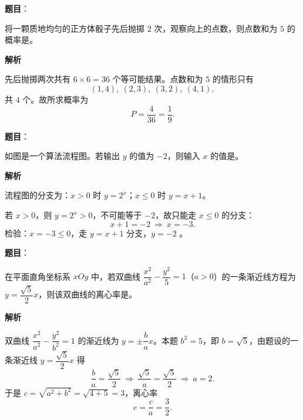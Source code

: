 \begin{answer}

\textbf{题目}：

将一颗质地均匀的正方体骰子先后抛掷 $2$ 次，观察向上的点数，则点数和为 $5$ 的概率是\gkblank{}。

\textbf{解析}

先后抛掷两次共有 $6\times6=36$ 个等可能结果。点数和为 $5$ 的情形只有
\nopagebreak[4]
\[(1,4),\ (2,3),\ (3,2),\ (4,1),\]
共 $4$ 个。故所求概率为
\nopagebreak[4]
\[P=\frac4{36}=\frac19 .\]


\end{answer}
\begin{answer}

\textbf{题目}：

如图是一个算法流程图。若输出 $y$ 的值为 $-2$，则输入 $x$ 的值是\gkblank{}。
\nopagebreak[4]
\begin{center}\end{center}
\nopagebreak[4]
\textbf{解析}

流程图的分支为：$x>0$ 时 $y=2^x$；$x\leqslant0$ 时 $y=x+1$。

若 $x>0$，则 $y=2^x>0$，不可能等于 $-2$，故只能走 $x\leqslant0$ 的分支：
\nopagebreak[4]
\[x+1=-2\ \Longrightarrow\ x=-3 .\]
检验：$x=-3\leqslant0$，走 $y=x+1$ 分支，$y=-2$ 。


\end{answer}
\begin{answer}

\textbf{题目}：

在平面直角坐标系 $xOy$ 中，若双曲线 $\dfrac{x^2}{a^2}-\dfrac{y^2}{5}=1$（$a>0$）的一条渐近线方程为 $y=\dfrac{\sqrt5}{2}x$，则该双曲线的离心率是\gkblank{}。

\textbf{解析}

双曲线 $\dfrac{x^2}{a^2}-\dfrac{y^2}{b^2}=1$ 的渐近线为 $y=\pm\dfrac bax$。本题 $b^2=5$，即 $b=\sqrt5$，由题设的一条渐近线 $y=\dfrac{\sqrt5}2x$ 得
\nopagebreak[4]
\[\frac ba=\frac{\sqrt5}{2}\ \Longrightarrow\ \frac{\sqrt5}{a}=\frac{\sqrt5}{2}\ \Longrightarrow\ a=2 .\]
于是 $c=\sqrt{a^2+b^2}=\sqrt{4+5}=3$，离心率
\nopagebreak[4]
\[e=\frac ca=\frac32 .\]


\end{answer}
